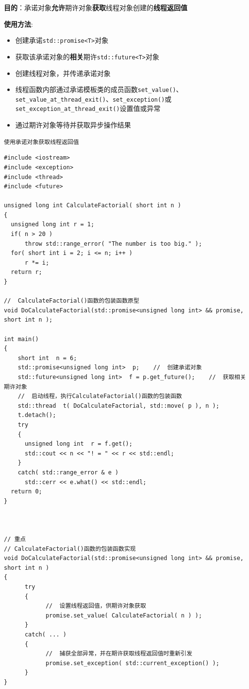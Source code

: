 \documentclass[UTF8,a4paper,12pt]{ctexbook}
\begin{document}
					\textbf{目的}：承诺对象\textbf{允许}期许对象\textbf{获取}线程对象创建的\textbf{线程返回值}

					\textbf{使用方法}:
						\begin{itemize}[itemindent = 2em]
							\item 创建承诺\verb|std::promise<T>|对象
							
							\item 获取该承诺对象的\textbf{相关}期许\verb|std::future<T>|对象
							
							\item 创建线程对象，并传递承诺对象
							
							\item 线程函数内部通过承诺模板类的成员函数\verb|set_value()|、\verb|set_value_at_thread_exit()|、\verb|set_exception()|或\verb|set_exception_at_thread_exit()|设置值或异常
							
							\item 通过期许对象等待并获取异步操作结果
							
						\end{itemize}
					
					\verb|使用承诺对象获取线程返回值|	
					\begin{lstlisting}
#include <iostream>
#include <exception>
#include <thread>
#include <future>

unsigned long int CalculateFactorial( short int n )
{
  unsigned long int r = 1;
  if( n > 20 )    
	  throw std::range_error( "The number is too big." );
  for( short int i = 2; i <= n; i++ )    
	  r *= i;
  return r;
}

//  CalculateFactorial()函数的包装函数原型
void DoCalculateFactorial(std::promise<unsigned long int> && promise, short int n );

int main()
{
    short int  n = 6;
    std::promise<unsigned long int>  p;    //  创建承诺对象
    std::future<unsigned long int>  f = p.get_future();    //  获取相关期许对象
    //  启动线程，执行CalculateFactorial()函数的包装函数
    std::thread  t( DoCalculateFactorial, std::move( p ), n );
    t.detach();
    try
    {
      unsigned long int  r = f.get();
      std::cout << n << "! = " << r << std::endl;
    }
    catch( std::range_error & e )
      std::cerr << e.what() << std::endl;
  return 0;
}



// 重点
// CalculateFactorial()函数的包装函数实现
void DoCalculateFactorial(std::promise<unsigned long int> && promise, short int n )
{
	  try
	  {
		    //  设置线程返回值，供期许对象获取
		    promise.set_value( CalculateFactorial( n ) );
	  }
	  catch( ... )
	  {
		    //  捕获全部异常，并在期许获取线程返回值时重新引发
		    promise.set_exception( std::current_exception() );
	  }
}

					\end{lstlisting}
	
\end{document}
